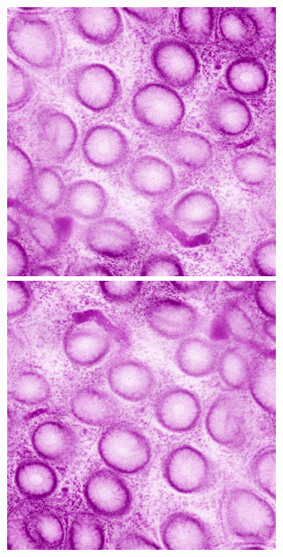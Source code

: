 \begin{figure}[H]
	\centering

	\begin{minipage}{0.25\columnwidth}
		\centering
		\includegraphics[clip, width=\linewidth]{fig/preprocessing/data_aug/horizontal_flip/horizontal_flip}
	\end{minipage}
	\begin{minipage}{0.1\columnwidth}
		\hspace{2truemm}
	\end{minipage}
	\begin{minipage}{0.25\columnwidth}
		\centering
		\includegraphics[clip, width=\linewidth]{fig/preprocessing/data_aug/vertical_flip/vertical_flip}
	\end{minipage}
	

\end{figure}
